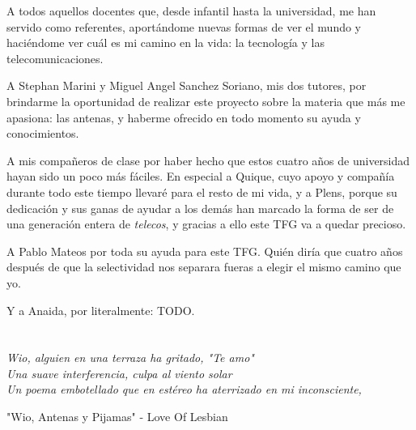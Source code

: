 \par A todos aquellos docentes que, desde infantil hasta la universidad, me han servido como referentes, aportándome nuevas formas de ver el mundo y haciéndome ver cuál es mi camino en la vida: la tecnología y las telecomunicaciones.




\par A Stephan Marini y Miguel Angel Sanchez Soriano, mis dos tutores, por brindarme la oportunidad de realizar este proyecto sobre la materia que más me apasiona: las antenas, y haberme ofrecido en todo momento su ayuda y conocimientos.




\par A mis compañeros de clase por haber hecho que estos cuatro años de universidad hayan sido un poco más fáciles. En especial a Quique, cuyo apoyo y compañía durante todo este tiempo llevaré para el resto de mi vida, y a Plens, porque su dedicación y sus ganas de ayudar a los demás han marcado la forma de ser de una generación entera de \textit{telecos}, y gracias a ello este TFG va a quedar precioso. 




\par A Pablo Mateos por toda su ayuda para este TFG. Quién diría que cuatro años después de que la selectividad nos separara fueras a elegir el mismo camino que yo.




\par Y a Anaida, por literalmente: TODO. 
\cleardoublepage %
\chapter*{}
\setlength{\leftmargin}{0.5\textwidth}
\setlength{\parsep}{0cm}
\addtolength{\topsep}{0.5cm}
\begin{flushright}
\small\em{
Wio, alguien en una terraza ha gritado, "Te amo"\\
Una suave interferencia, culpa al viento solar\\
Un poema embotellado que en estéreo ha aterrizado en mi inconsciente,\\}
\end{flushright}


\begin{flushright}
\small{
"Wio, Antenas y Pijamas" - Love Of Lesbian
}
\end{flushright}


\cleardoublepage %

